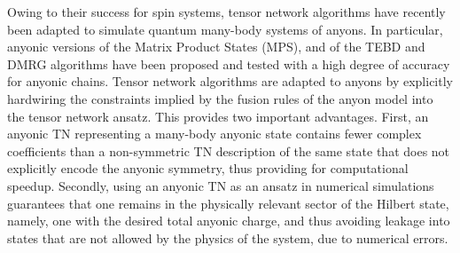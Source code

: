 \documentclass[aps,reprint,superscriptaddress,amsmath,amssymb,amsfonts,prb]{revtex4-1}
\begin{document}
Owing to their success for spin systems, tensor network algorithms have recently been 
adapted to simulate quantum many-body systems of anyons.\cite{Pfeifer2010a,Konig2010,pfeifer2012a} In particular, anyonic versions of the Matrix Product States (MPS), and of the TEBD and DMRG algorithms have been proposed and tested with a high degree of accuracy for anyonic chains.\cite{Singh,Pfeifer2015} Tensor network algorithms are adapted to anyons by explicitly hardwiring the constraints implied by the fusion rules of the anyon model into the tensor network ansatz. This provides two important advantages. First, {an anyonic TN representing a many-body anyonic state contains fewer complex coefficients than a {non-symmetric TN} description of the same state that does not explicitly encode the anyonic symmetry}, thus providing for computational speedup. Secondly, using an anyonic TN as an ansatz in numerical simulations guarantees that one remains in the physically relevant sector of the Hilbert state, namely, one with the desired total anyonic charge, and thus avoiding 
leakage into states that are not 
allowed by 
the physics of the system, due to numerical errors.

\end{document}
